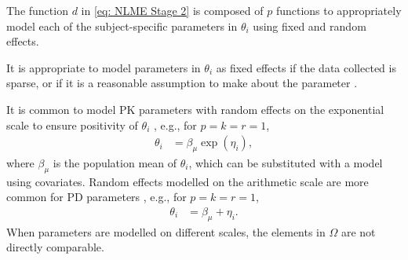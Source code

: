 The function $d$ in \eqref{eq: NLME Stage 2} is composed of $p$ functions to appropriately model each of the subject-specific parameters in $\theta_{i}$ using fixed and random effects. 


It is appropriate to model parameters in $\theta_{i}$ as fixed effects if the data collected is sparse, or if it is a reasonable assumption to make about the parameter \citep[p. 238]{bonate}.

It is common to model PK parameters with random effects on the exponential scale to ensure positivity of $\theta_{i}$ \citep[p. 238]{bonate} , e.g., for $p = k = r = 1$, 
\begin{align*}
    \theta_{i} &= \beta_{\mu} \exp(\eta_{i}),
\end{align*}
where $\beta_{\mu}$ is the population mean of $\theta_{i}$, which can be substituted with a model using covariates.
Random effects modelled on the arithmetic scale are more common for PD parameters \citep[p. 240]{bonate}, e.g., for $p = k = r = 1$, 
\begin{align*}
     \theta_{i} &= \beta_{\mu} + \eta_{i}.
\end{align*}
When parameters are modelled on different scales, the 
elements in $\Omega$ are not directly comparable.

